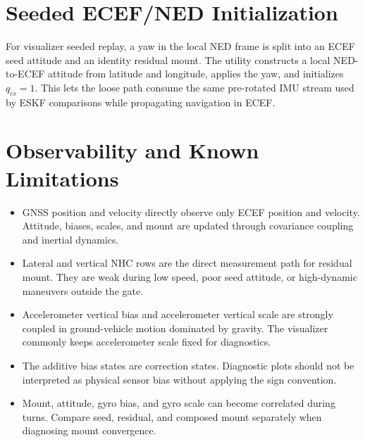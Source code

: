 \documentclass[11pt]{article}
\begin{document}
\section{Seeded ECEF/NED Initialization}

For visualizer seeded replay, a yaw in the local NED frame is split into an
ECEF seed attitude and an identity residual mount. The utility constructs a
local NED-to-ECEF attitude from latitude and longitude, applies the yaw, and
initializes \(q_{cs}=1\). This lets the loose path consume the same
pre-rotated IMU stream used by ESKF comparisons while propagating navigation in
ECEF.

\section{Observability and Known Limitations}

\begin{itemize}[leftmargin=1.5em]
\item GNSS position and velocity directly observe only ECEF position and
velocity. Attitude, biases, scales, and mount are updated through covariance
coupling and inertial dynamics.
\item Lateral and vertical NHC rows are the direct measurement path for
residual mount. They are weak during low speed, poor seed attitude, or
high-dynamic maneuvers outside the gate.
\item Accelerometer vertical bias and accelerometer vertical scale are strongly
coupled in ground-vehicle motion dominated by gravity. The visualizer commonly
keeps accelerometer scale fixed for diagnostics.
\item The additive bias states are correction states. Diagnostic plots should
not be interpreted as physical sensor bias without applying the sign convention.
\item Mount, attitude, gyro bias, and gyro scale can become correlated during
turns. Compare seed, residual, and composed mount separately when diagnosing
mount convergence.
\end{itemize}
\end{document}
